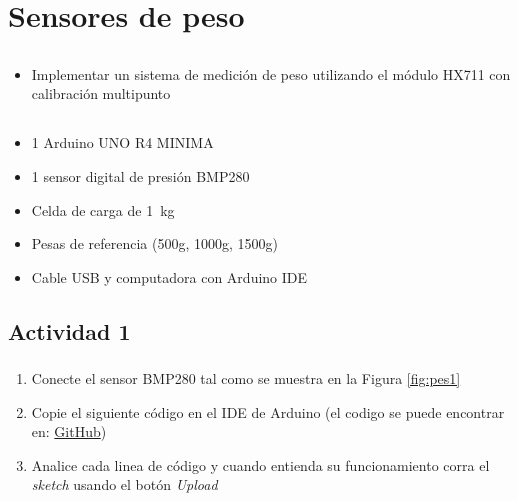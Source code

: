 \chapter{Sensores de peso}
\section{\obj}
\capacidad
\begin{itemize}
\item Implementar un sistema de medición de peso utilizando el módulo HX711 con calibración multipunto
\end{itemize}

\section{\mat}
\begin{itemize}
\item 1 Arduino UNO R4 MINIMA
\item 1 sensor digital de presión BMP280
  \item Celda de carga de \SI{1}{\kilogram}
  \item Pesas de referencia (500g, 1000g, 1500g)
  \item Cable USB y computadora con Arduino IDE
\end{itemize}

\section{Actividad 1}
\subsection{\pro}
\begin{enumerate}
    \item Conecte el sensor BMP280 tal como se muestra en la Figura \ref{fig:pes1}
    \item Copie el siguiente código en el IDE de Arduino (el codigo se puede encontrar en: \href{https://github.com/juanjorojash/instrumentacion_I/blob/master/code/L04/L04.ino}{GitHub})
      
    \item Analice cada linea de código y cuando entienda su funcionamiento corra el \emph{sketch} usando el botón \emph{Upload}
\end{enumerate}

